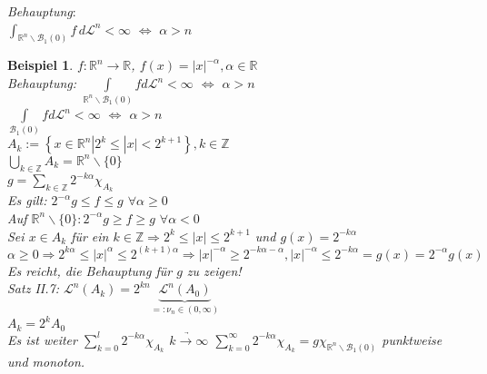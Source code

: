 \documentclass[11pt]{memoir}
\theoremstyle{changebreak}
\newtheorem{Beispiel}{Beispiel}[chapter]
\begin{document}

\emph{Behauptung}: \\
$\int_{\mathbb R^n \backslash \mathscr B_1 (0)} f \, d\mathscr L^n < \infty$ $\Leftrightarrow$ $\alpha > n$





\begin{Beispiel}
$f: \mathbb R^n \rightarrow \mathbb R$, $f(x) = |x|^{-\alpha}, \alpha \in \mathbb R$ \\
\emph{Behauptung:} $\int\limits_{\mathbb R^n\backslash \mathscr B_1(0)} f d\mathscr L^n < \infty$ $\Leftrightarrow$ $\alpha > n$ \\
$\int\limits_{\mathscr B_1(0)} f d\mathscr L^n < \infty$ $\Leftrightarrow$ $\alpha > n$ \\
$A_k := \left\{x \in \mathbb R^n | 2^k \leq |x| < 2^{k+1}\right\}, k \in \mathbb Z$ \\
$\bigcup\limits_{k \in \mathbb Z} A_k = \mathbb R^n\backslash\{0\}$ \\
$g = \sum\limits_{k \in \mathbb Z} 2^{-k\alpha}\chi_{A_k}$ \\
Es gilt: $2^{-\alpha}g \leq f \leq g$ $\forall \alpha \geq 0$ \\
Auf $\mathbb R^n\backslash\{0\}: 2^{-\alpha}g \geq f\geq g$ $\forall \alpha < 0$ \\
Sei $x \in A_k$ für ein $k \in \mathbb Z \Rightarrow 2^k \leq |x| \leq 2^{k+1}$ und $g(x) = 2^{-k\alpha}$ \\
$\alpha \geq 0 \Rightarrow 2^{k\alpha} \leq |x|^\alpha \leq 2^{(k+1)\alpha} \Rightarrow |x|^{-\alpha} \geq 2^{-k\alpha - \alpha}, |x|^{-\alpha} \leq 2^{-k\alpha} = g(x) = 2^{-\alpha} g(x)$ \\
Es reicht, die Behauptung für $g$ zu zeigen! \\
Satz II.7: $\mathscr L^n(A_k) = 2^{kn}\underbrace{\mathscr L^n(A_0)}_{=: \nu_n \in (0, \infty)}$ \\
$A_k = 2^k A_0$ \\
Es ist weiter $\sum\limits_{k=0}^l 2^{-k\alpha}\chi_{A_k}$ $\underrightarrow{k \rightarrow \infty}$ $\sum\limits_{k=0}^\infty 2^{-k\alpha}\chi_{A_k} = g\chi_{\mathbb R^n \backslash \mathscr B_1(0)}$ punktweise und monoton. \\

\end{Beispiel}
\end{document}
